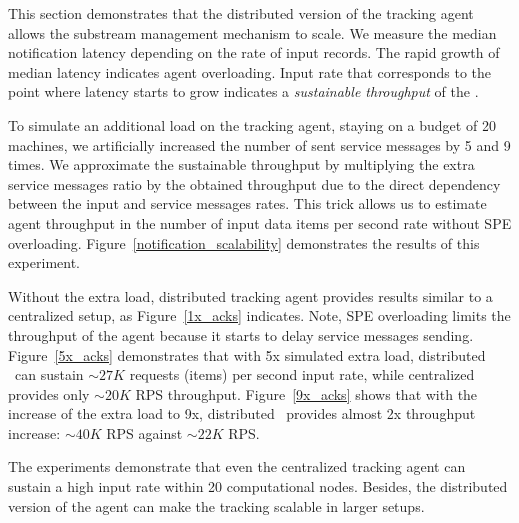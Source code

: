 This section demonstrates that the distributed version of the tracking agent allows the substream management mechanism to scale. We measure the median notification latency depending on the rate of input records. The rapid growth of median latency indicates agent overloading. Input rate that corresponds to the point where latency starts to grow indicates a {\em sustainable throughput} of the \tracker. 

To simulate an additional load on the tracking agent, staying on a budget of 20 machines, we artificially increased the number of sent service messages by 5 and 9 times. We approximate the sustainable throughput by multiplying the extra service messages ratio by the obtained throughput due to the direct dependency between the input and service messages rates. This trick allows us to estimate agent throughput in the number of input data items per second rate without  SPE overloading. Figure~\ref{notification_scalability} demonstrates the results of this experiment.

Without the extra load, distributed tracking agent provides results similar to a centralized setup, as Figure~\ref{1x_acks} indicates. Note, SPE overloading limits the throughput of the agent because it starts to delay service messages sending. Figure~\ref{5x_acks} demonstrates that with 5x simulated extra load, distributed \tracker\ can sustain $\sim 27K$ requests (items) per second input rate, while centralized provides only $\sim 20K$ RPS throughput. Figure~\ref{9x_acks} shows that with the increase of the extra load to 9x, distributed \tracker\ provides almost 2x throughput increase: $\sim 40K$ RPS against $\sim 22K$ RPS. 

The experiments demonstrate that even the centralized tracking agent can sustain a high input rate within 20 computational nodes. Besides, the distributed version of the agent can make the tracking scalable in larger setups.

